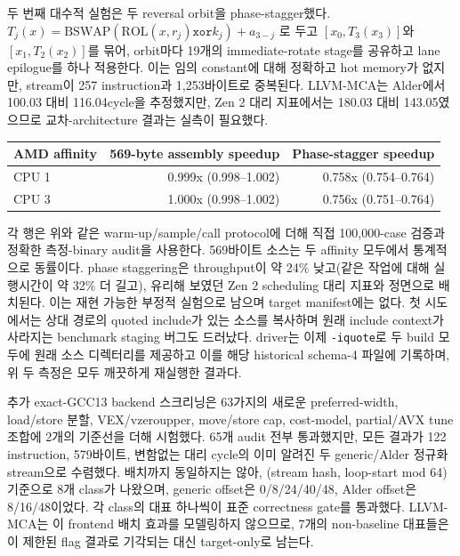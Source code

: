\documentclass[11pt,a4paper]{article}
\begin{document}
두 번째 대수적 실험은 두 reversal orbit을 phase-stagger했다.
$T_j(x)=\mathrm{BSWAP}(\mathrm{ROL}(x,r_j)\mathbin{\mathtt{xor}}k_j)+a_{3-j}$
로 두고 $[x_0,T_3(x_3)]$와 $[x_1,T_2(x_2)]$를 묶어, orbit마다 19개의
immediate-rotate stage를 공유하고 lane epilogue를 하나 적용한다.  이는
임의 constant에 대해 정확하고 hot memory가 없지만, stream이 257
instruction과 1,253바이트로 중복된다.  LLVM-MCA는 Alder에서 100.03
대비 116.04cycle을 추정했지만, Zen 2 대리 지표에서는 180.03 대비
143.05였으므로 교차-architecture 결과는 실측이 필요했다.

\begin{center}
\small
\begin{tabular}{lrr}
\toprule
AMD affinity & 569-byte assembly speedup & Phase-stagger speedup \\
\midrule
CPU 1 & 0.999x (0.998--1.002) & 0.758x (0.754--0.764) \\
CPU 3 & 1.000x (0.998--1.002) & 0.756x (0.751--0.764) \\
\bottomrule
\end{tabular}
\end{center}

각 행은 위와 같은 warm-up/sample/call protocol에 더해 직접
100,000-case 검증과 정확한 측정-binary audit을 사용한다.  569바이트
소스는 두 affinity 모두에서 통계적으로 동률이다.  phase staggering은
throughput이 약 24\% 낮고(같은 작업에 대해 실행시간이 약 32\% 더
길고), 유리해 보였던 Zen 2 scheduling 대리 지표와 정면으로 배치된다.
이는 재현 가능한 부정적 실험으로 남으며 target manifest에는 없다.
첫 시도에서는 상대 경로의 quoted include가 있는 소스를 복사하며 원래
include context가 사라지는 benchmark staging 버그도 드러났다.
driver는 이제 \texttt{-iquote}로 두 build 모두에 원래 소스
디렉터리를 제공하고 이를 해당 historical schema-4 파일에 기록하며,
위 두 측정은 모두 깨끗하게 재실행한 결과다.

추가 exact-GCC13 backend 스크리닝은 63가지의 새로운 preferred-width,
load/store 분할, VEX/vzeroupper, move/store cap, cost-model,
partial/AVX tune 조합에 2개의 기준선을 더해 시험했다.  65개 audit
전부 통과했지만, 모든 결과가 122 instruction, 579바이트, 변함없는
대리 cycle의 이미 알려진 두 generic/Alder 정규화 stream으로 수렴했다.
배치까지 동일하지는 않아, (stream hash, loop-start mod 64) 기준으로
8개 class가 나왔으며, generic offset은 0/8/24/40/48, Alder offset은
8/16/48이었다.  각 class의 대표 하나씩이 표준 correctness gate를
통과했다.  LLVM-MCA는 이 frontend 배치 효과를 모델링하지 않으므로, 7개의
non-baseline 대표들은 이 제한된 flag 결과로 기각되는 대신 target-only로
남는다.
\end{document}
